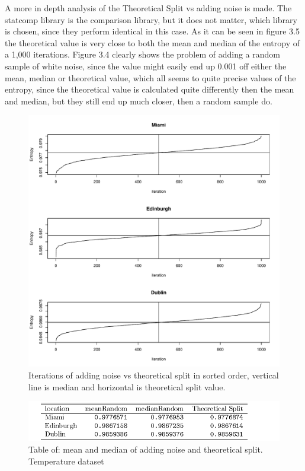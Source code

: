 A more in depth analysis of the Theoretical Split vs adding noise is made. The statcomp library is the comparison library, but it does not matter, which library is chosen, since they perform identical in this case. As it can be seen in figure 3.5 the theoretical value is very close to both the mean and median of the entropy of a 1,000 iterations. Figure 3.4 clearly shows the problem of adding a random sample of white noise, since the value might easily end up 0.001 off either the mean, median or theoretical value, which all seems to quite precise values of the entropy, since the theoretical value is calculated quite differently then the mean and median, but they still end up much closer, then a random sample do. 

\begin{figure}
    \centering
    \includegraphics[width=\textwidth,keepaspectratio]{Weather/noiseStochasticTheoretical.pdf}
    \caption{Iterations of adding noise vs theoretical split in sorted order, vertical line is median and horizontal is theoretical split value.}
\end{figure}

\begin{figure}
    \centering
    \includegraphics[width=\textwidth,keepaspectratio]{Weather/random_vs_theoreticalSplit.pdf}
    \caption{Table of: mean and median of adding noise and theoretical split. Temperature dataset}
\end{figure}

